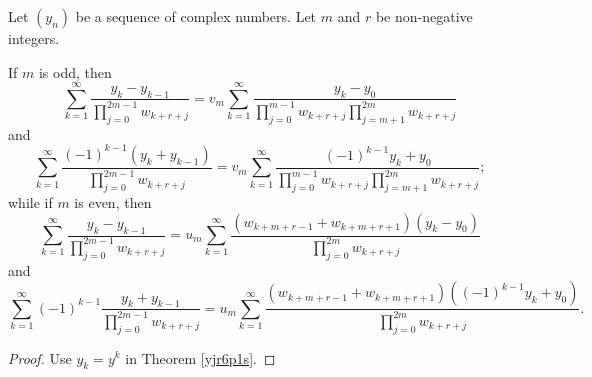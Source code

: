 \documentclass[12pt,reqno]{article}
\begin{document}
\begin{corollary}\label{zihreqe}
	Let $(y_n)$ be a sequence of complex numbers. Let $m$ and $r$ be non-negative integers. 
	
	If $m$ is odd, then
	\begin{equation*}
		\sum_{k = 1}^\infty  {\frac{{y_k  - y_{k - 1} }}{{\prod\limits_{j = 0}^{2m - 1} {w_{k + r + j} } }}}  =v_m \sum_{k = 1}^\infty  {\frac{y_k  - y_0 }{\prod\limits_{j = 0}^{m - 1} {w_{k + r + j} } \prod\limits_{j = m + 1}^{2m} w_{k + r + j} }}
		\end{equation*}
	and
		\begin{equation}\label{y+y}
		\sum_{k = 1}^{\infty}  \frac{( - 1)^{k - 1} ( y_k  + y_{k - 1})}{\prod\limits_{j = 0}^{2m - 1} w_{k + r + j}}  = v_m \sum_{k = 1}^{\infty}  \frac{{( - 1)^{k - 1} y_k  + y_0 }}{\prod\limits_{j = 0}^{m - 1} {w_{k + r + j} } \prod\limits_{j = m + 1}^{2m} {w_{k + r + j}}};
		\end{equation}
	while if $m$ is even, then
		\begin{equation*}
		\sum_{k = 1}^\infty  {\frac{{y_k  - y_{k - 1} }}{\prod\limits_{j = 0}^{2m - 1} {w_{k + r + j} } }}  = u_m\sum_{k = 1}^\infty  \frac{{( {w_{k + m + r - 1}  + w_{k + m + r + 1} })( y_k  - y_0 )}}{\prod\limits_{j = 0}^{2m} w_{k + r + j}  }
		\end{equation*}
		and
		\begin{equation*}
		\sum_{k = 1}^\infty  {(-1)^{k-1}\frac{{y_k  + y_{k - 1} }}{\prod\limits_{j = 0}^{2m - 1} {w_{k + r + j} } }}  = u_m \sum_{k = 1}^\infty  {\frac{{ ( {w_{k + m + r - 1}  + w_{k + m + r + 1} } )( {( - 1)^{k - 1}y_k  + y_0 } )}}{{\prod\limits_{j = 0}^{2m} {w_{k + r + j} } }}} .
		\end{equation*}
\end{corollary}
\begin{proof}
	Use $y_k=y^k$ in Theorem \ref{yjr6p1s}.
\end{proof}
\end{document}
